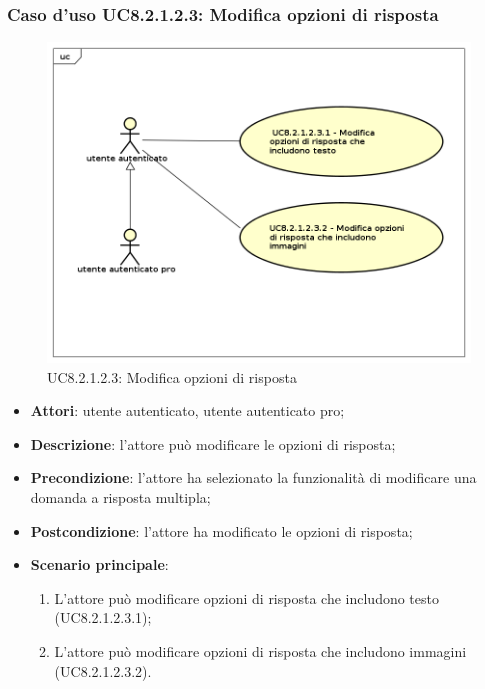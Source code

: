 \subsubsection{Caso d'uso UC8.2.1.2.3: Modifica opzioni di risposta}
	\label{UC8.2.1.2.3}
	\begin{figure}[h]
		\centering
			\includegraphics[scale=0.45,keepaspectratio]{UML/UC8_2_1_2_3.png}
		\caption{UC8.2.1.2.3: Modifica opzioni di risposta}
	\end{figure}
	\FloatBarrier
	\begin{itemize}
		\item
			\textbf{Attori}: utente autenticato, utente autenticato pro;
		\item		
			\textbf{Descrizione}: l'attore può modificare le opzioni di risposta;
		\item
			\textbf{Precondizione}: l'attore ha selezionato la funzionalità di modificare una domanda a risposta multipla; 
		\item
			\textbf{Postcondizione}: l'attore ha modificato le opzioni di risposta;
		\item
			\textbf{Scenario principale}:
	       		\begin{enumerate}
	       			\item
	       			L'attore può modificare opzioni di risposta che includono testo (UC8.2.1.2.3.1);
					\item
					L'attore può modificare opzioni di risposta che includono immagini (UC8.2.1.2.3.2).
	 			\end{enumerate}
	\end{itemize}	
	
